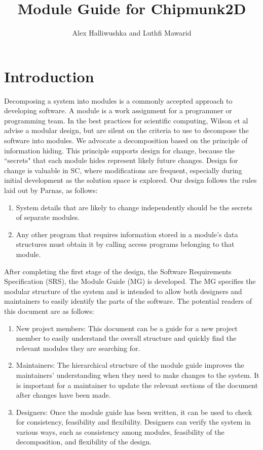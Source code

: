 \documentclass[12pt]{article}
\title{Module Guide for Chipmunk2D}
\author{Alex Halliwushka and Luthfi Mawarid}
\begin{document}
\maketitle
\tableofcontents
\newpage
\section{Introduction}
\label{Sec:Intr}
Decomposing a system into modules is a commonly accepted approach to developing software.  A module is a work assignment for a programmer or programming team. In the best practices for scientific computing, Wilson et al advise a modular design, but are silent on the criteria to use to decompose the software into modules.  We advocate a decomposition based on the principle of information hiding. This principle supports design for change, because the ``secrets" that each module hides represent likely future changes.  Design for change is valuable in SC, where modifications are frequent, especially during initial development as the solution space is explored.
Our design follows the rules laid out by Parnas, as follows:
\begin{enumerate}
\item{System details that are likely to change independently should be the secrets of separate modules.}
\item{Any other program that requires information stored in a module's data structures must obtain it by calling access programs belonging to that module.}
\end{enumerate}
After completing the first stage of the design, the Software Requirements Specification (SRS), the Module Guide (MG) is developed. The MG specifies the modular structure of the system and is intended to allow both designers and maintainers to easily identify the parts of the software.  The potential readers of this document are as follows:
\begin{enumerate}
\item{New project members: This document can be a guide for a new project member to easily understand the overall structure and quickly find the relevant modules they are searching for.}
\item{Maintainers: The hierarchical structure of the module guide improves the maintainers' understanding when they need to make changes to the system. It is important for a maintainer to update the relevant sections of the document after changes have been made.}
\item{Designers: Once the module guide has been written, it can be used to check for consistency, feasibility and flexibility. Designers can verify the system in various ways, such as consistency among modules, feasibility of the decomposition, and flexibility of the design.}
\end{enumerate}
\end{document}
